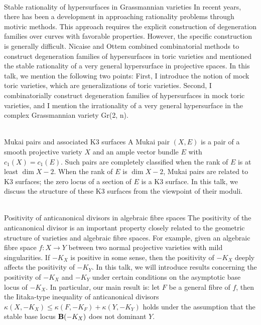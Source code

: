 \documentclass[dvipdfmx,a4paper,12pt]{article}
\theoremstyle{plain} %
\theoremstyle{definition} %
\begin{document}
\\
Stable rationality of hypersurfaces in Grassmannian varieties
\vskip3mm
In recent years, there has been a development in approaching rationality problems through motivic methods. This approach requires the explicit construction of degeneration families over curves with favorable properties. However, the specific construction is generally difficult. Nicaise and Ottem combined combinatorial methods to construct degeneration families of hypersurfaces in toric varieties and mentioned the stable rationality of a very general hypersurface in projective spaces. In this talk, we mention the following two points: First, I introduce the notion of mock toric varieties, which are generalizations of toric varieties. Second, I combinatorially construct degeneration families of hypersurfaces in mock toric varieties, and I mention the irrationality of a very general hypersurface in the complex Grassmannian variety Gr(2, n).
\vskip5mm


\vskip3mm

\\
Mukai pairs and associated K3 surfaces
\vskip3mm
A Mukai pair $(X,E)$ is a pair of a smooth projective variety $X$ and an ample vector bundle $E$ with $c_1(X)=c_1(E)$.
Such pairs are completely classified when the rank of $E$ is at least $\dim X -2$.
When the rank of $E$ is $\dim X -2$, Mukai pairs are related to K3 surfaces; the zero locus of a section of $E$ is a K3 surface.
In this talk, we discuss the structure of these K3 surfaces from the viewpoint of their moduli.
\vskip6mm

\\
Positivity of anticanonical divisors in algebraic fibre spaces
\vskip3mm
The positivity of the anticanonical divisor is an important property closely related to the geometric structure of varieties and algebraic fibre spaces. For example, given an algebraic fibre space $f : X \rightarrow Y$ between two normal projective varieties with mild singularities. If $-K_X$ is positive in some sense, then the positivity of $-K_X$ deeply affects the positivity of $-K_Y$. In this talk, we will introduce results concerning the positivity of $-K_X$ and $-K_Y$ under certain conditions on the asymptotic base locus of $-K_X$. In particular, our main result is: let $F$ be a general fibre of $f$, then the Iitaka-type inequality of anticanonical divisors $\kappa(X, -K_X) \leq \kappa(F, -K_F ) + \kappa(Y, -K_Y )$ holds under the assumption that the stable base locus ${\bf B}(-K_X)$ does not dominant $Y$.
\vskip6mm
\end{document}
